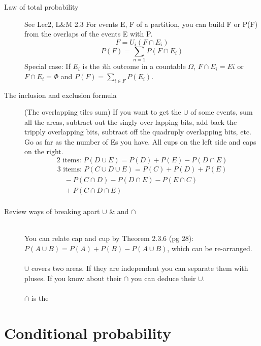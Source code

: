\begin{description}
\item[Law of total probability] See Lec2, L\&M 2.3 \newline
For events E, F of a partition, you can build F or P(F) from the overlaps of the events E with P.
	\[ F = U_i(F \cap E_i)  \]
	\[ P(F) = \sum_{n=1} P(F \cap E_i) \]
Special case: If $E_i$ is the \textit{i}th outcome in a countable $\Omega$, $F \cap E_i = Ei$ 
or $F \cap E_i = \Phi$ and $P(F) = \sum_{i \in F} P(E_i)$. 

\item[The inclusion and exclusion formula] (The overlapping tiles sum)
If you want to get the $\cup$ of some events, sum all the areas, subtract out the singly over lapping bits, add back the tripply overlapping bits, subtract off the quadruply overlapping bits, etc.  Go as far as the number of Es you have. 
All cups on the left side and caps on the right. 
	\[\mbox{2 items: } P(D \cup E) = P(D) + P(E) - P(D \cap E) \]
	\begin{align*}
	\mbox{3 items: }   
	P(C \cup D \cup E) = P(C) + P(D) + P(E) \\
	\quad - P(C \cap D) - P(D \cap E) - P(E \cap C) \\
	\quad + P(C \cap D \cap E) \\
	\end{align*}

\item[Review ways of breaking apart $\cup$ \& and $\cap$] \hfill \\

 You can relate cap and cup {\tiny by Theorem 2.3.6 (pg 28)}:
$P(A \cup B) = P(A) + P(B) - P(A \cup B)$, which can be re-arranged.  \hfill \\
\hfill \\
$\cup$ covers two areas.  If they are independent you can separate them with pluses.  If you know about their $\cap$ you can deduce their $\cup$.  \hfill \\
\hfill \\
$\cap$ is the

\end{description}

\section{Conditional probability}

